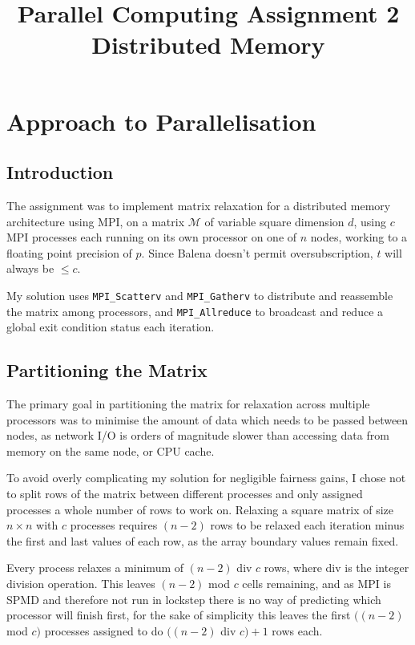 \documentclass[12pt]{article}
\title{\textbf{Parallel Computing Assignment 2 \\ Distributed Memory}}
\begin{document}
\maketitle


\tableofcontents
\listoffigures
\clearpage


\section{Approach to Parallelisation}

\subsection{Introduction}

The assignment was to implement matrix relaxation for a distributed memory architecture using MPI, on a matrix $\mathcal{M}$ of variable square dimension $d$, using $c$ MPI processes each running on its own processor on one of $n$ nodes, working to a floating point precision of $p$. Since Balena doesn't permit oversubscription, $t$ will always be $\leq c$.

My solution uses \texttt{MPI\_Scatterv} and \texttt{MPI\_Gatherv} to distribute and reassemble the matrix among processors, and \texttt{MPI\_Allreduce} to broadcast and reduce a global exit condition status each iteration.

\subsection{Partitioning the Matrix}

The primary goal in partitioning the matrix for relaxation across multiple processors was to minimise the amount of data which needs to be passed between nodes, as network I/O is orders of magnitude slower than accessing data from memory on the same node, or CPU cache.

To avoid overly complicating my solution for negligible fairness gains, I chose not to split rows of the matrix between different processes and only assigned processes a whole number of rows to work on. Relaxing a square matrix of size $n \times n$ with $c$ processes requires $(n-2)$ rows to be relaxed each iteration minus the first and last values of each row, as the array boundary values remain fixed.

Every process relaxes a minimum of $(n-2)$ div $c$ rows, where div is the integer division operation. This leaves $(n-2)$ mod $c$ cells remaining, and as MPI is SPMD and therefore not run in lockstep there is no way of predicting which processor will finish first, for the sake of simplicity this leaves the first $((n-2)$ mod $c)$ processes assigned to do $((n-2)$ div $c) + 1$ rows each.
\end{document}
